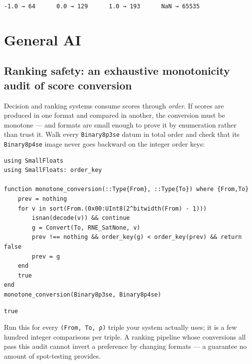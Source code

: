\begin{verbatim}
-1.0 → 64      0.0 → 129      1.0 → 193      NaN → 65535
\end{verbatim}



\section{General AI}



\label{12995498770613901834}{}


\subsection{Ranking safety: an exhaustive monotonicity audit of score conversion}



\label{8732453457535267162}{}


Decision and ranking systems consume scores through \emph{order}. If scores are produced in one format and compared in another, the conversion must be monotone — and formats are small enough to prove it by enumeration rather than trust it. Walk every \texttt{Binary8p3se} datum in total order and check that its \texttt{Binary8p4se} image never goes backward on the integer order keys:




\begin{verbatim}
using SmallFloats
using SmallFloats: order_key

function monotone_conversion(::Type{From}, ::Type{To}) where {From,To}
    prev = nothing
    for v in sort(From.(0x00:UInt8(2^bitwidth(From) - 1)))
        isnan(decode(v)) && continue
        g = Convert(To, RNE_SatNone, v)
        prev !== nothing && order_key(g) < order_key(prev) && return false
        prev = g
    end
    true
end
monotone_conversion(Binary8p3se, Binary8p4se)
\end{verbatim}




\begin{verbatim}
true
\end{verbatim}



Run this for every \texttt{(From, To, ρ)} triple your system actually uses; it is a few hundred integer comparisons per triple. A ranking pipeline whose conversions all pass this audit cannot invert a preference by changing formats — a guarantee no amount of spot-testing provides.




